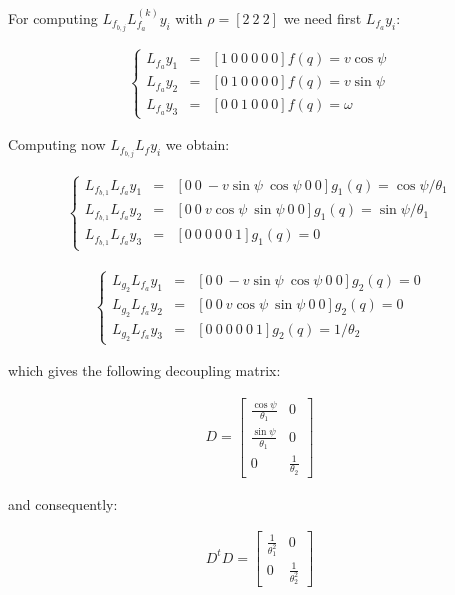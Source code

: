\documentclass[letterpaper, 10 pt, conference]{ieeeconf}  %
\begin{document}
For computing $L_{f_{b,j}}L_{f_a}^{(k)}y_i$ with $\rho = [2\ 2\ 2]$ we need first $L_{f_a}y_i$:

\begin{eqnarray}
\left\lbrace\begin{array}{lcl}
L_{f_a}y_1 & = & [1\ 0\ 0\ 0\ 0\ 0]f(q) = v\cos\psi\\
L_{f_a}y_2 & = & [0\ 1\ 0\ 0\ 0\ 0]f(q) = v\sin\psi\\
L_{f_a}y_3 & = & [0\ 0\ 1\ 0\ 0\ 0]f(q) = \omega
\end{array}\right.
\end{eqnarray}

Computing now $L_{f_{b,j}}L_fy_i$ we obtain:

\begin{eqnarray}
\left\lbrace\begin{array}{lcl}
L_{f_{b,1}}L_{f_a}y_1 & = & [0\ 0\ -v\sin\psi\ \cos\psi\ 0\ 0]g_1(q) = \cos\psi/\theta_1\\
L_{f_{b,1}}L_{f_a}y_2 & = & [0\ 0\ v\cos\psi\ \sin\psi\ 0\ 0]g_1(q) = \sin\psi/\theta_1\\
L_{f_{b,1}}L_{f_a}y_3 & = & [0\ 0\ 0\ 0\ 0\ 1]g_1(q) = 0
\end{array}\right.
\end{eqnarray}

\begin{eqnarray}
\left\lbrace\begin{array}{lcl}
L_{g_2}L_{f_a}y_1 & = & [0\ 0\ -v\sin\psi\ \cos\psi\ 0\ 0]g_2(q) = 0\\
L_{g_2}L_{f_a}y_2 & = & [0\ 0\ v\cos\psi\ \sin\psi\ 0\ 0]g_2(q) = 0\\
L_{g_2}L_{f_a}y_3 & = & [0\ 0\ 0\ 0\ 0\ 1]g_2(q) = 1/\theta_2
\end{array}\right.
\end{eqnarray}

which gives the following decoupling matrix:

\begin{eqnarray}
D = 
\left[\begin{array}{cc}
\frac{\cos\psi}{\theta_1} & 0\\
\frac{\sin\psi}{\theta_1} & 0\\
0 & \frac{1}{\theta_2}
\end{array}\right]
\end{eqnarray}

and consequently:

\begin{eqnarray}
D^tD = 
\left[\begin{array}{cc}
\frac{1}{\theta_1^2} & 0\\
0 & \frac{1}{\theta_2^2}
\end{array}\right]
\end{eqnarray}
\end{document}
